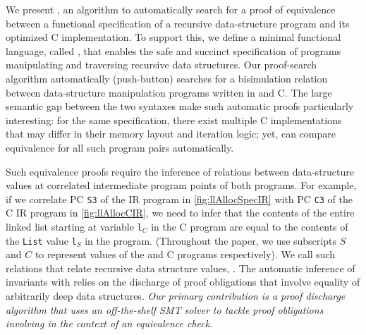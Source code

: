 We present \toolName{}, an algorithm to automatically
search for a proof of equivalence between a functional specification
of a recursive data-structure program
and its
optimized C implementation.
To support
this, we define a minimal functional language, called \SpecL{}, that enables the
safe and succinct specification
of programs manipulating and traversing recursive data structures.
Our proof-search algorithm automatically (push-button)
searches for a bisimulation relation
between data-structure manipulation programs
written in \SpecL{} and C.
The large semantic gap between
the two syntaxes make such automatic
proofs particularly interesting: for the same \SpecL{} specification,
there exist multiple
C implementations that may differ in their memory layout and
iteration logic; yet, \toolName{} can compare equivalence for all such
program pairs automatically.

Such equivalence proofs require the
inference of relations between data-structure values
at correlated intermediate program points of both programs.
For example, if we correlate PC {\tt S3} of the \SpecL{}
IR program in \cref{fig:llAllocSpecIR}
with PC {\tt C3} of the C IR program in \cref{fig:llAllocCIR}, we
need to infer
that the contents of the entire linked list starting at
variable {\tt l$_C$} in the C program are equal to
the contents of the {\tt List} value {\tt l$_S$} in the \SpecL{} program.
(Throughout the paper, we use subscripts $S$ and $C$ to represent values
of the \SpecL{} and C programs respectively).
We call such relations that relate
recursive data structure values, {\em \recursiveRelations{}}.
The automatic
inference of invariants
with \recursiveRelations{}
relies on the discharge of proof obligations
that involve equality of arbitrarily deep
data structures.
{\em Our primary contribution is a
proof discharge algorithm that
uses an off-the-shelf SMT
solver to tackle proof obligations involving \recursiveRelations{}
in the context of an equivalence check}.


